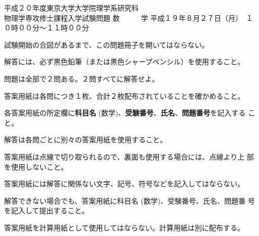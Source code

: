 \begin{inshicover}%
  {平成２０年度東京大学大学院理学系研究科\\物理学専攻修士課程入学試験問題}%
  {数　　　学}%
  {平成１９年８月２７日（月）　１０時００分〜１１時００分}
\item 試験開始の合図があるまで、この問題冊子を開いてはならない。
\item 解答には、必ず黒色鉛筆（または黒色シャープペンシル）を使用すること。
\item 問題は全部で２問ある。２問すべてに解答せよ。
\item 答案用紙は各問につき１枚、合計２枚配布されていることを確かめること。
\item 各答案用紙の所定欄に{\bf 科目名} (数学)、{\bf 受験番号}、{\bf 氏名}、{\bf 問題番号}を記入する
      こと。
\item 解答は各問ごとに別々の答案用紙を使用すること。
\item 答案用紙は点線で切り取られるので、裏面も使用する場合には、点線より上
      部を使用しないこと。
\item 答案用紙には解答に関係ない文字、記号、符号などを記入してはならない。
\item 解答できない場合でも、答案用紙に科目名 (数学)、受験番号、氏名、問題番
      号を記入して提出すること。
\item 答案用紙を計算用紙として使用してはならない。計算用紙は別に配布する。
\end{inshicover}
